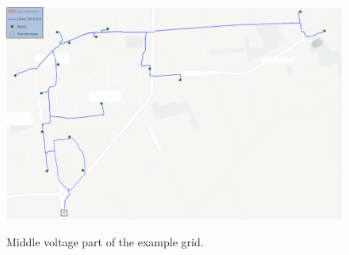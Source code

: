 \begin{figure}[h]
	\begin{centering}
		{\includegraphics[scale=0.5]{figures/experiments/enwg_mv.png}}
		\caption[Example grid (MV)]{Middle voltage part of the example grid.}
		\label{fig:enwg_mv}
	\end{centering}
\end{figure}
